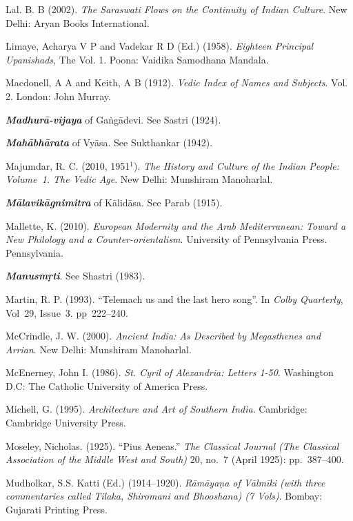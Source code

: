 \begin{thebibliography}{99}
Lal. B. B (2002). {\sl The Saraswati Flows on the Continuity of Indian Culture}. New Delhi: Aryan Books International. 

Limaye, Acharya V P and Vadekar R D (Ed.) (1958). {\sl Eighteen Principal Upanishads}, The Vol. 1. Poona: Vaidika Samodhana Mandala.

Macdonell, A A and Keith, A B (1912). {\sl Vedic Index of Names and Subjects}. Vol. 2. London: John Murray.

{\sl\bfseries Madhurā-vijaya} of Gaṅgādevi. See Sastri (1924).

{\sl\bfseries Mahābhārata} of Vyāsa. See Sukthankar (1942).

Majumdar, R. C. (2010, 1951$^{1}$). {\sl The History and Culture of the Indian People: Volume~1. The Vedic Age}. New Delhi: Munshiram Manoharlal. 

{\sl\bfseries Mālavikāgnimitra} of Kālidāsa. See Parab (1915).

Mallette, K. (2010). {\sl European Modernity and the Arab Mediterranean: Toward a New Philology and a Counter-orientalism}. University of Pennsylvania Press. Pennsylvania.

{\sl\bfseries Manusmṛti}. See Shastri (1983).

Martin, R. P. (1993). “Telemach us and the last hero song”. In {\sl Colby Quarterly}, Vol~29, Issue~3. pp~222--240.

McCrindle, J. W. (2000). {\sl Ancient India: As Described by Megasthenes and Arrian}. New Delhi: Munshiram Manoharlal. 

McEnerney, John I. (1986). {\sl St. Cyril of Alexandria: Letters 1-50}. Washington D.C: The Catholic University of America Press. 

Michell, G. (1995). {\sl Architecture and Art of Southern India}. Cambridge: Cambridge University Press.

Moseley, Nicholas. (1925). “Pius Aeneas.” {\sl The Classical Journal (The Classical Association of the Middle West and South)} 20, no.~7 (April 1925): pp.~387--400.

Mudholkar, S.S. Katti (Ed.) (1914--1920). {\sl Rāmāyaṇa of Vālmīki (with three commentaries called Tilaka,    Shiromani and Bhooshana) (7 Vols)}. Bombay: Gujarati Printing Press. 


\end{thebibliography}

